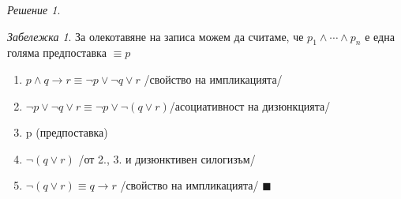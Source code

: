 \documentclass[10pt, a4paper]{article}
\theoremstyle{definition}
\theoremstyle{remark}
\newtheorem*{remark}{Забележка}
\newtheorem*{sol}{Решение}
\begin{document}
\begin{sol}
\begin{remark}
    За олекотавяне на записа можем да считаме, че \(p_1\wedge \cdots\wedge p_n\) е една голяма предпоставка \(\equiv p\)
\end{remark}
\begin{enumerate}
    \item \(p\wedge q\to r \equiv \neg p\vee \neg q\vee r\) /свойство на импликацията/
    \item \(\neg p\vee \neg q\vee r \equiv \neg p\vee \neg (q\vee r)\)/асоциативност на дизюнкцията/
    \item p (предпоставка)
    \item \(\neg (q\vee r)\) /от 2., 3. и дизюнктивен силогизъм/
    \item \(\neg (q\vee r)\equiv q\to r\) /свойство на импликацията/
    \(\blacksquare\)
\end{enumerate}
\end{sol}
\end{document}
